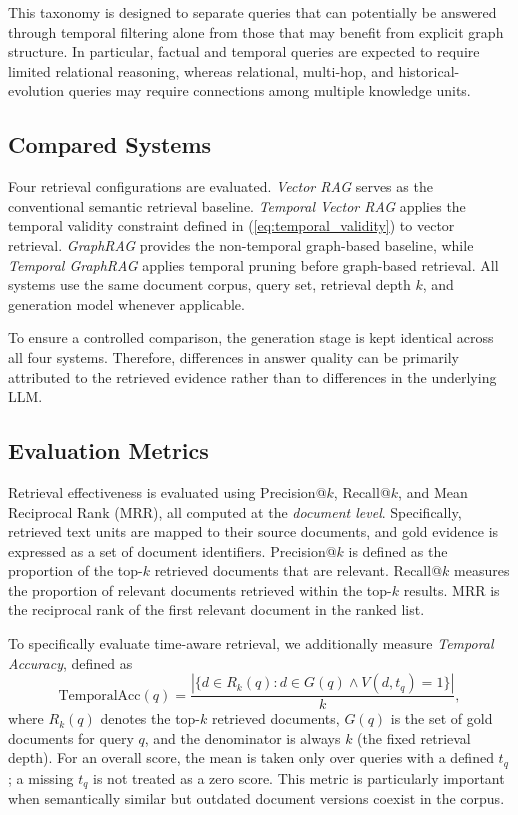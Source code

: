 \documentclass[conference]{IEEEtran}
\numberwithin{equation}{section}
\begin{document}
This taxonomy is designed to separate queries that can potentially be answered through temporal filtering alone from those that may benefit from explicit graph structure. In particular, factual and temporal queries are expected to require limited relational reasoning, whereas relational, multi-hop, and historical-evolution queries may require connections among multiple knowledge units.

\subsection{Compared Systems}

Four retrieval configurations are evaluated. \textit{Vector RAG} serves as the conventional semantic retrieval baseline. \textit{Temporal Vector RAG} applies the temporal validity constraint defined in (\ref{eq:temporal_validity}) to vector retrieval. \textit{GraphRAG} provides the non-temporal graph-based baseline, while \textit{Temporal GraphRAG} applies temporal pruning before graph-based retrieval. All systems use the same document corpus, query set, retrieval depth $k$, and generation model whenever applicable.

To ensure a controlled comparison, the generation stage is kept identical across all four systems. Therefore, differences in answer quality can be primarily attributed to the retrieved evidence rather than to differences in the underlying LLM.

\subsection{Evaluation Metrics}

Retrieval effectiveness is evaluated using Precision@$k$, Recall@$k$, and Mean Reciprocal Rank (MRR), all computed at the \textit{document level}. Specifically, retrieved text units are mapped to their source documents, and gold evidence is expressed as a set of document identifiers. Precision@$k$ is defined as the proportion of the top-$k$ retrieved documents that are relevant. Recall@$k$ measures the proportion of relevant documents retrieved within the top-$k$ results. MRR is the reciprocal rank of the first relevant document in the ranked list.

To specifically evaluate time-aware retrieval, we additionally measure \textit{Temporal Accuracy}, defined as
\begin{equation}
\text{TemporalAcc}(q)=\frac{|\{d\in R_k(q): d\in G(q) \wedge V(d,t_q)=1\}|}{k},
\label{eq:temporal_acc}
\end{equation}
where $R_k(q)$ denotes the top-$k$ retrieved documents, $G(q)$ is the set of gold documents for query $q$, and the denominator is always $k$ (the fixed retrieval depth). For an overall score, the mean is taken only over queries with a defined $t_q$; a missing $t_q$ is not treated as a zero score. This metric is particularly important when semantically similar but outdated document versions coexist in the corpus.
\end{document}
